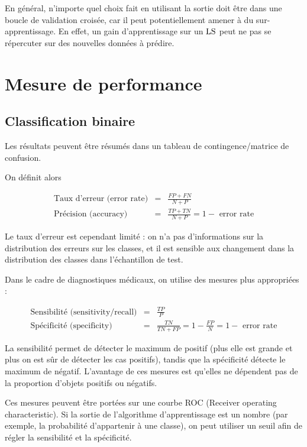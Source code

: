 	En général, n'importe quel choix fait en utilisant la sortie doit être dans une boucle de validation croisée, car il peut potentiellement amener à du sur-apprentissage. En effet, un gain d'apprentissage sur un $\text{LS}$ peut ne pas se répercuter sur des nouvelles données à prédire.
	
		
\section{Mesure de performance}

	\subsection{Classification binaire}
	
	Les résultats peuvent être résumés dans un tableau de contingence/matrice de confusion.
	
	
	On définit alors
	
	\begin{eqnarray*}
	\text{Taux d'erreur (error rate)} & = & \frac{FP + FN}{N + P} \\
	\text{Précision (accuracy)} & = & \frac{TP + TN}{N + P} = 1 - \text{ error rate}
	\end{eqnarray*}
	
	Le taux d'erreur est cependant limité : on n'a pas d'informations sur la distribution des erreurs sur les classes, et il est sensible aux changement dans la distribution des classes dans l'échantillon de test.
	
	
	Dans le cadre de diagnostiques médicaux, on utilise des mesures plus appropriées :
	
	\begin{eqnarray*}
	\text{Sensibilité (sensitivity/recall)} & = & \frac{TP}{P} \\
	\text{Spécificité (specificity)} & = & \frac{TN}{TN + FP} = 1 - \frac{FP}{N} = 1 - \text{ error rate}
	\end{eqnarray*}
		
	La sensibilité permet de détecter le maximum de positif (plus elle est grande et plus on est sûr de détecter les cas positifs), tandis que la spécificité détecte le maximum de négatif. L'avantage de ces mesures est qu'elles ne dépendent pas de la proportion d'objets positifs ou négatifs.
	
	Ces mesures peuvent être portées sur une courbe ROC (Receiver operating characteristic). Si la sortie de l'algorithme d'apprentissage est un nombre (par exemple, la probabilité d'appartenir à une classe), on peut utiliser un seuil afin de régler la sensibilité et la spécificité.
	
